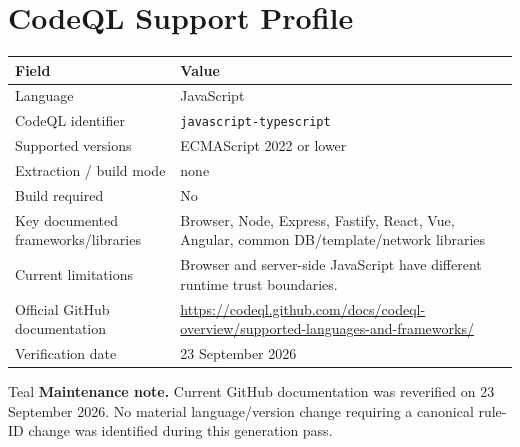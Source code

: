 \documentclass[10pt,letterpaper]{article}
\newcommand{\code}[1]{\texttt{\small #1}}
\begin{document}
\section{CodeQL Support Profile}
\begin{tabularx}{\textwidth}{@{}P{1.9in}Y@{}}
\toprule
\textbf{Field} & \textbf{Value}\\
\midrule
Language & JavaScript\\
CodeQL identifier & \code{javascript-typescript}\\
Supported versions & ECMAScript 2022 or lower\\
Extraction / build mode & none\\
Build required & No\\
Key documented frameworks/libraries & Browser, Node, Express, Fastify, React, Vue, Angular, common DB/template/network libraries\\
Current limitations & Browser and server-side JavaScript have different runtime trust boundaries.\\
Official GitHub documentation & \url{https://codeql.github.com/docs/codeql-overview/supported-languages-and-frameworks/}\\
Verification date & 23 September 2026\\
\bottomrule
\end{tabularx}
\begin{callout}{Teal}
\textbf{Maintenance note.} Current GitHub documentation was reverified on 23 September 2026. No material language/version change requiring a canonical rule-ID change was identified during this generation pass.
\end{callout}
\end{document}
